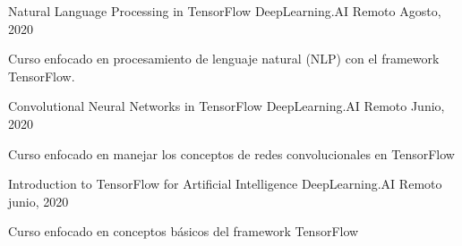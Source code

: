 

\begin{cventries}

  \cventry
    {Natural Language Processing in TensorFlow} %
    {DeepLearning.AI} %
    {Remoto} %
    {Agosto, 2020} %
    {
      \begin{cvitems} %
        \item {Curso enfocado en procesamiento de lenguaje natural (NLP) con el framework TensorFlow.}
      \end{cvitems}
    }

\cventry
{Convolutional Neural Networks in TensorFlow} %
{DeepLearning.AI} %
{Remoto} %
{Junio, 2020} %
{
  \begin{cvitems} %
    \item {Curso enfocado en manejar los conceptos de redes convolucionales en TensorFlow}
  \end{cvitems}
}

\cventry
{Introduction to TensorFlow for Artificial Intelligence} %
{DeepLearning.AI} %
{Remoto} %
{junio, 2020} %
{
  \begin{cvitems} %
    \item {Curso enfocado en conceptos básicos del framework TensorFlow}
  \end{cvitems}
}

\end{cventries}